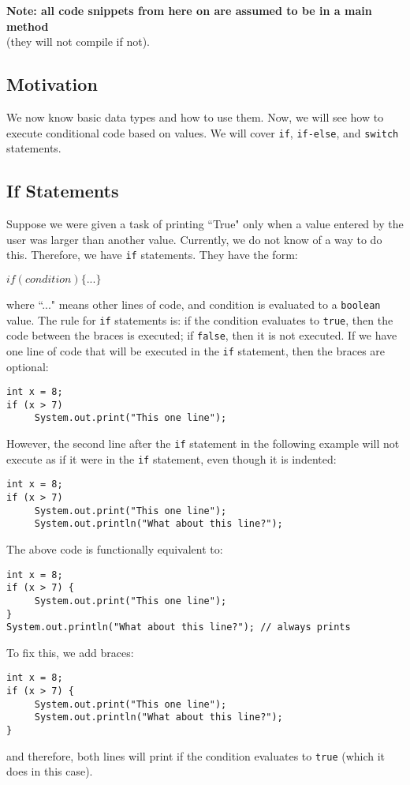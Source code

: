 
\begin{center}
\textbf{Note: all code snippets from here on are assumed to be in a main method} \\ (they will not compile if not).
\end{center}

\subsection{Motivation}
We now know basic data types and how to use them. Now, we will see how to execute conditional code based on values. We will cover \verb|if|, \verb|if-else|, and \verb|switch| statements.

\subsection{If Statements}
Suppose we were given a task of printing ``True" only when a value entered by the user was larger than another value. Currently, we do not know of a way to do this. Therefore, we have \verb|if| statements. They have the form:
\begin{center}
$if(condition) \{ ... \}$
\end{center}
where ``..." means other lines of code, and condition is evaluated to a \verb|boolean| value. The rule for \verb|if| statements is: if the condition evaluates to \verb|true|, then the code between the braces is executed; if \verb|false|, then it is not executed. If we have one line of code that will be executed in the \verb|if| statement, then the braces are optional:
\begin{lstlisting}
int x = 8;
if (x > 7)
     System.out.print("This one line");
\end{lstlisting}
However, the second line after the \verb|if| statement in the following example will not execute as if it were in the \verb|if| statement, even though it is indented:
\begin{lstlisting}
int x = 8;
if (x > 7)
     System.out.print("This one line");
     System.out.println("What about this line?");
\end{lstlisting}
The above code is functionally equivalent to:
\begin{lstlisting}
int x = 8;
if (x > 7) {
     System.out.print("This one line");
}
System.out.println("What about this line?"); // always prints
\end{lstlisting}
To fix this, we add braces:
\begin{lstlisting}
int x = 8;
if (x > 7) {
     System.out.print("This one line");
     System.out.println("What about this line?");
}
\end{lstlisting}
and therefore, both lines will print if the condition evaluates to \verb|true| (which it does in this case).

